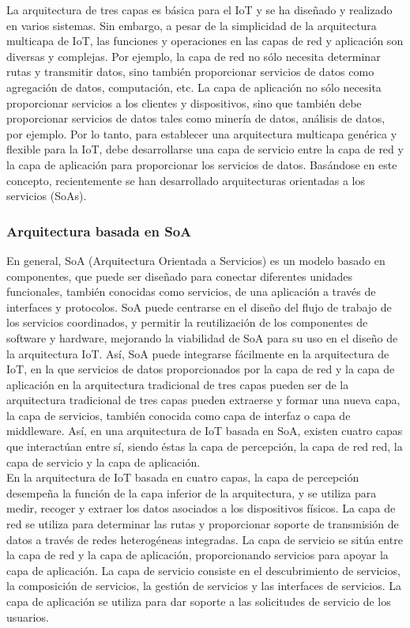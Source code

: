 {\begin{itemize}
\end{itemize}

La arquitectura de tres capas es básica para el IoT y se ha diseñado y realizado en varios sistemas. Sin embargo, a pesar de la simplicidad de la arquitectura multicapa de IoT, las funciones y operaciones en las capas de red y aplicación son diversas y complejas. Por ejemplo, la capa de red no sólo necesita determinar rutas y transmitir datos, sino también proporcionar servicios de datos como agregación de datos, computación, etc. La capa de aplicación no sólo necesita proporcionar servicios a los clientes y dispositivos, sino que también debe proporcionar servicios de datos tales como minería de datos, análisis de datos, por ejemplo. Por lo tanto, para establecer una arquitectura multicapa genérica y flexible para la IoT, debe desarrollarse una capa de servicio entre la capa de red y la capa de aplicación para proporcionar los servicios de datos. Basándose en este concepto, recientemente se han desarrollado arquitecturas orientadas a los servicios (SoAs). \cite{lin2017survey}

\subsubsection{Arquitectura basada en SoA}

En general, SoA (Arquitectura Orientada a Servicios) es un modelo basado en componentes, que puede ser diseñado para conectar diferentes unidades funcionales, también conocidas como servicios, de una aplicación a través de interfaces y protocolos. SoA puede centrarse en el diseño del flujo de trabajo de los servicios coordinados, y permitir la reutilización de los componentes de software y hardware, mejorando la viabilidad de SoA para su uso en el diseño de la arquitectura IoT. Así, SoA puede integrarse fácilmente en la arquitectura de IoT, en la que servicios de datos proporcionados por la capa de red y la capa de aplicación en la arquitectura tradicional de tres capas pueden ser de la arquitectura tradicional de tres capas pueden extraerse y formar una nueva capa, la capa de servicios, también conocida como capa de interfaz o capa de middleware. Así, en una arquitectura de IoT basada en SoA, existen cuatro capas que interactúan entre sí, siendo éstas la capa de percepción, la capa de red red, la capa de servicio y la capa de aplicación. \\

En la arquitectura de IoT basada en cuatro capas, la capa de percepción desempeña la función de la capa inferior de la arquitectura, y se utiliza para medir, recoger y extraer los datos asociados a los dispositivos físicos. La capa de red se utiliza para determinar las rutas y proporcionar soporte de transmisión de datos a través de redes heterogéneas integradas. La capa de servicio se sitúa entre la capa de red y la capa de aplicación, proporcionando servicios para apoyar la capa de aplicación. La capa de servicio consiste en el descubrimiento de servicios, la composición de servicios, la gestión de servicios y las interfaces de servicios. La capa de aplicación se utiliza para dar soporte a las solicitudes de servicio de los usuarios. \cite{lin2017survey}

}
